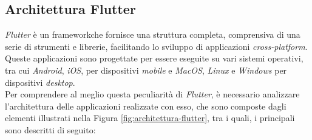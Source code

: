 \subsection{Architettura Flutter}
\label{subsec:architettura-flutter}

\emph{Flutter} è un \gls{framework}\glsoccur che fornisce una struttura completa, comprensiva di una serie di strumenti e librerie, facilitando lo sviluppo di applicazioni \emph{cross-platform}.
Queste applicazioni sono progettate per essere eseguite su vari sistemi operativi, tra cui \emph{Android}, \emph{iOS}, per dispositivi \emph{mobile} e \emph{MacOS}, \emph{Linux} e \emph{Windows} per dispositivi \emph{desktop}.\\
Per comprendere al meglio questa peculiarità di \emph{Flutter}, è necessario analizzare l'architettura \cite{site:flutter-architecture} delle applicazioni realizzate con esso, che sono composte dagli elementi illustrati nella Figura \ref{fig:architettura-flutter}, tra i quali, i principali sono descritti di seguito:
